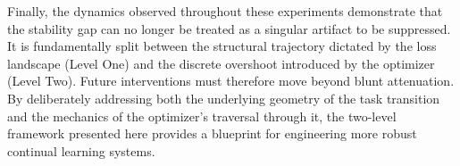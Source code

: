 Finally, the dynamics observed throughout these experiments demonstrate that the stability gap can no longer be treated as a singular artifact to be suppressed. It is fundamentally split between the structural trajectory dictated by the loss landscape (Level One) and the discrete overshoot introduced by the optimizer (Level Two). Future interventions must therefore move beyond blunt attenuation. By deliberately addressing both the underlying geometry of the task transition and the mechanics of the optimizer's traversal through it, the two-level framework presented here provides a blueprint for engineering more robust continual learning systems.